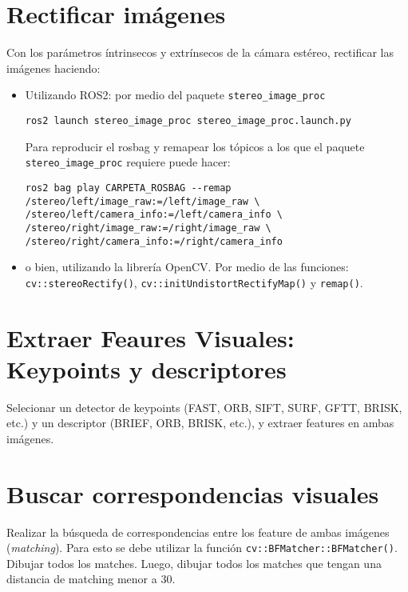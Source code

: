 \documentclass[tp]{lcc}
\begin{document}
\section{Rectificar imágenes}

Con los parámetros íntrinsecos y extrínsecos de la cámara estéreo, rectificar las imágenes haciendo:

\begin{itemize}
    \item Utilizando ROS2: por medio del paquete \lstinline{stereo_image_proc}
    
\begin{lstlisting}[style=bash]     
ros2 launch stereo_image_proc stereo_image_proc.launch.py
\end{lstlisting}

Para reproducir el rosbag y remapear los tópicos a los que el paquete \lstinline{stereo_image_proc} requiere puede hacer:
\begin{lstlisting}[style=bash]   
ros2 bag play CARPETA_ROSBAG --remap /stereo/left/image_raw:=/left/image_raw \
/stereo/left/camera_info:=/left/camera_info \
/stereo/right/image_raw:=/right/image_raw \
/stereo/right/camera_info:=/right/camera_info
\end{lstlisting}


    \item o bien, utilizando la librería OpenCV. Por medio de las funciones: \lstinline{cv::stereoRectify()},  \lstinline{cv::initUndistortRectifyMap()} y  \lstinline{remap()}.

\end{itemize}

\section{Extraer Feaures Visuales: Keypoints y descriptores}
Selecionar un detector de keypoints (FAST, ORB, SIFT, SURF, GFTT, BRISK, etc.) y un descriptor (BRIEF, ORB, BRISK, etc.), y extraer features en ambas imágenes.

\section{Buscar correspondencias visuales}
Realizar la búsqueda de correspondencias entre los feature de ambas imágenes (\emph{matching}). Para esto se debe utilizar la función \lstinline{cv::BFMatcher::BFMatcher()}. Dibujar todos los matches. Luego, dibujar todos los matches que tengan una distancia de matching menor a 30.
\end{document}
